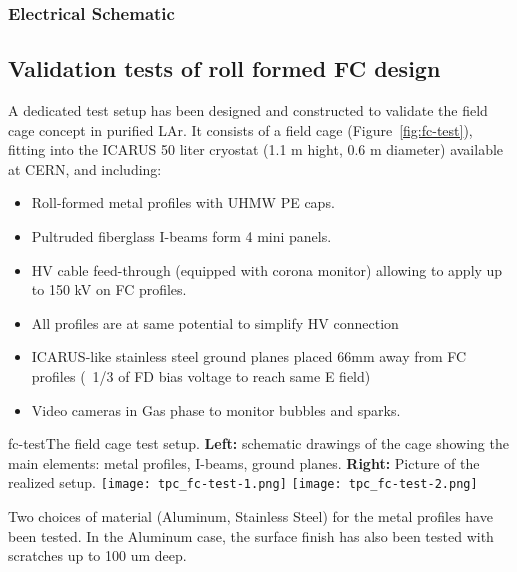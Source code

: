 \subsubsection{Electrical Schematic}
 

\subsection{Validation tests of roll formed FC design}

A dedicated test setup has been designed and constructed to validate the field cage concept  in purified LAr.
It consists of a field cage (Figure~\ref{fig:fc-test}), fitting into the ICARUS 50 liter cryostat (1.1 m hight, 0.6 m diameter) available at CERN, and  including:

\begin{itemize}	
\item Roll-formed metal profiles with UHMW PE caps.
\item Pultruded fiberglass I-beams form 4 mini panels.
\item HV cable feed-through (equipped with corona monitor) allowing to apply up to 150 kV on FC profiles.
\item All profiles are at same potential to simplify HV connection
\item ICARUS-like stainless steel ground planes placed  66mm away from FC profiles (~1/3 of FD bias voltage to reach
same E field)
\item Video cameras in Gas phase to monitor bubbles and sparks.
\end{itemize}

\begin{cdrfigure}{fc-test}{The field cage test setup. 
 {\bf Left:} schematic drawings of the cage showing the main elements: metal profiles, I-beams, ground planes.
  {\bf Right:} Picture of the realized setup.}
\texttt{[image: tpc\_fc-test-1.png]}
\texttt{[image: tpc\_fc-test-2.png]}
\end{cdrfigure}

Two choices of material (Aluminum, Stainless Steel) for the metal profiles have been tested. In the Aluminum case, the surface finish has also been tested with scratches up to 100 um deep. 


